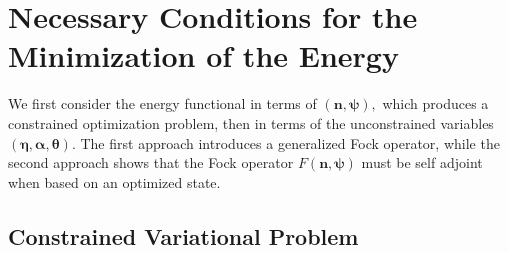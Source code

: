 \documentclass[aps,preprint]{revtex4}%
\begin{document}
\section{Necessary Conditions for the Minimization of the Energy
\label{Evariation}}

We first consider the energy functional in terms of $\left(
\bm{n,\psi }\right)  ,$ which produces a constrained optimization problem,
then in terms of the unconstrained variables $\left(
\bm{\eta},\bm{\alpha },\bm{\theta}\right)  $. The first approach introduces a
generalized Fock operator, while the second approach shows that the Fock
operator $F\left(  \bm{n,\psi}\right)  $ must be self adjoint when based on an
optimized state.

\subsection{Constrained Variational Problem\label{CVP}}
\end{document}
